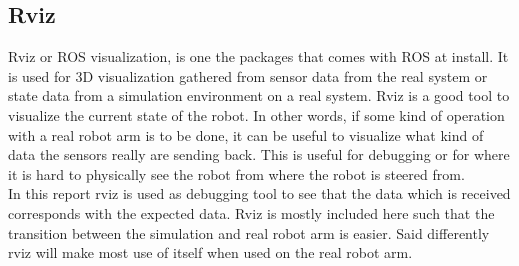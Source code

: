 \subsection{Rviz}
Rviz or ROS visualization, is one the packages that comes with ROS at install. It is used for 3D visualization gathered from sensor data from the real system or state data from a simulation environment on a real system. Rviz is a good tool to visualize the current state of the robot. In other words, if some kind of operation with a real robot arm is to be done, it can be useful to visualize what kind of data the sensors really are sending back. This is useful for debugging or for where it is hard to physically see the robot from where the robot is steered from.\\
In this report rviz is used as debugging tool to see that the data which is received corresponds with the expected data. Rviz is mostly included here such that the transition between the simulation and real robot arm is easier. Said differently rviz will make most use of itself when used on the real robot arm\cite{ROSWiki}. 

